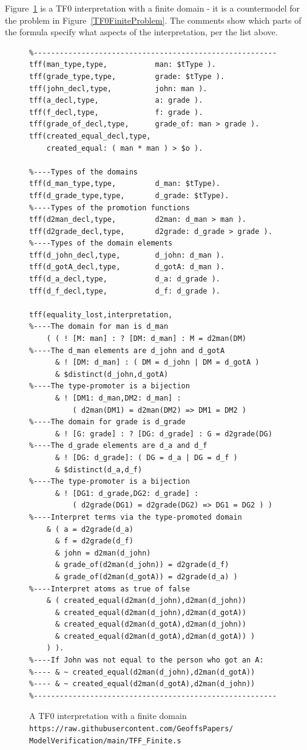\documentclass[letterpaper]{article}
\begin{document}
Figure~\ref{TF0FiniteInterpretation} is a TF0 interpretation with a finite domain - it is a 
countermodel for the problem in Figure~\ref{TF0FiniteProblem}.
The comments show which parts of the formula specify what aspects of the interpretation, per
the list above.

\begin{figure}[t!]
\scriptsize
{}
\begin{verbatim}
%--------------------------------------------------------
tff(man_type,type,           man: $tType ).
tff(grade_type,type,         grade: $tType ).
tff(john_decl,type,          john: man ).
tff(a_decl,type,             a: grade ).
tff(f_decl,type,             f: grade ).
tff(grade_of_decl,type,      grade_of: man > grade ).
tff(created_equal_decl,type, 
    created_equal: ( man * man ) > $o ).

%----Types of the domains
tff(d_man_type,type,         d_man: $tType).
tff(d_grade_type,type,       d_grade: $tType).
%----Types of the promotion functions
tff(d2man_decl,type,         d2man: d_man > man ).
tff(d2grade_decl,type,       d2grade: d_grade > grade ).
%----Types of the domain elements
tff(d_john_decl,type,        d_john: d_man ).
tff(d_gotA_decl,type,        d_gotA: d_man ).
tff(d_a_decl,type,           d_a: d_grade ).
tff(d_f_decl,type,           d_f: d_grade ).

tff(equality_lost,interpretation,
%----The domain for man is d_man
    ( ( ! [M: man] : ? [DM: d_man] : M = d2man(DM)
%----The d_man elements are d_john and d_gotA
      & ! [DM: d_man] : ( DM = d_john | DM = d_gotA )
      & $distinct(d_john,d_gotA)
%----The type-promoter is a bijection
      & ! [DM1: d_man,DM2: d_man] :
          ( d2man(DM1) = d2man(DM2) => DM1 = DM2 )
%----The domain for grade is d_grade
      & ! [G: grade] : ? [DG: d_grade] : G = d2grade(DG)
%----The d_grade elements are d_a and d_f
      & ! [DG: d_grade]: ( DG = d_a | DG = d_f )
      & $distinct(d_a,d_f)
%----The type-promoter is a bijection
      & ! [DG1: d_grade,DG2: d_grade] :
          ( d2grade(DG1) = d2grade(DG2) => DG1 = DG2 ) )
%----Interpret terms via the type-promoted domain
    & ( a = d2grade(d_a)
      & f = d2grade(d_f)
      & john = d2man(d_john)
      & grade_of(d2man(d_john)) = d2grade(d_f)
      & grade_of(d2man(d_gotA)) = d2grade(d_a) )
%----Interpret atoms as true of false
    & ( created_equal(d2man(d_john),d2man(d_john))
      & created_equal(d2man(d_john),d2man(d_gotA))
      & created_equal(d2man(d_gotA),d2man(d_john))
      & created_equal(d2man(d_gotA),d2man(d_gotA)) ) 
    ) ).
%----If John was not equal to the person who got an A:
%---- & ~ created_equal(d2man(d_john),d2man(d_gotA))
%---- & ~ created_equal(d2man(d_gotA),d2man(d_john))
%--------------------------------------------------------
\end{verbatim}
\caption{A TF0 interpretation with a finite domain \\
{\scriptsize {\tt https://raw.githubusercontent.com/GeoffsPapers/\\
ModelVerification/main/TFF\_Finite.s}}}
\label{TF0FiniteInterpretation}
\end{figure}
\end{document}

